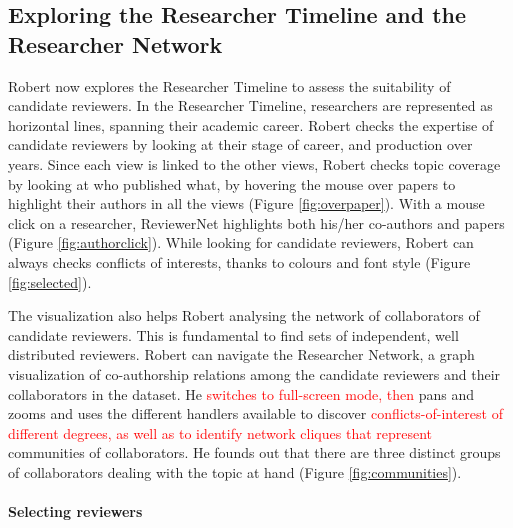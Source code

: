 \subsection*{Exploring the Researcher Timeline and the Researcher Network} 
 
Robert now explores the Researcher Timeline to assess the suitability of candidate reviewers. In the Researcher Timeline, researchers are represented as horizontal lines, spanning their academic career. Robert checks the expertise of candidate reviewers by looking at their stage of career, and production over years. Since each view is linked to the other views, Robert checks topic coverage by looking at who published what, by hovering the mouse over papers to highlight their authors in all the views (Figure \ref{fig:overpaper}). With a mouse click on a researcher, ReviewerNet highlights both his/her co-authors and papers (Figure \ref{fig:authorclick}).
While looking for candidate reviewers, Robert can always checks conflicts of interests, thanks to colours and font style (Figure \ref{fig:selected}). 

The visualization also helps Robert analysing the network of collaborators of candidate reviewers. This is fundamental to find sets of independent, well distributed reviewers.  Robert can navigate the Researcher Network, a graph visualization of co-authorship relations among the candidate reviewers and their collaborators in the dataset. He \textcolor{red}{switches to full-screen mode, then} pans and zooms and uses the different handlers available to discover \textcolor{red}{conflicts-of-interest of different degrees, as well as to identify network cliques that represent} communities of collaborators. He founds out that there are three distinct groups of collaborators dealing with the topic at hand (Figure \ref{fig:communities}).


\paragraph*{Selecting reviewers} 

